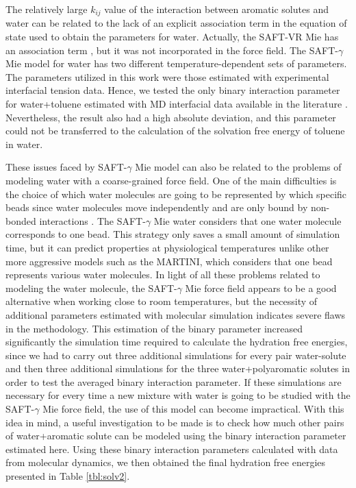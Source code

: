 \documentclass[final,12p,times,twocolumn]{elsarticle}
\begin{document}
	The relatively large $k_{ij}$ value of the interaction between aromatic solutes and water can be related to the lack of an explicit association term in the equation of state used to obtain the parameters for water. Actually, the SAFT-VR Mie has an association term \cite{lafitte2013}, but it was not incorporated in the force field. The SAFT-$\gamma$ Mie model for water \cite{lobanova2016} has two different temperature-dependent sets of parameters. The parameters utilized in this work were those estimated with experimental interfacial tension data. Hence, we tested the only binary interaction parameter for water+toluene estimated with MD interfacial data available in the literature \cite{herdes2017}. Nevertheless, the result also had a high absolute deviation, and this parameter could not be transferred to the calculation of the solvation free energy of toluene in water. 
	
	These issues faced by SAFT-$\gamma$ Mie model can also be related to the problems of modeling water with a coarse-grained force field. One of the main difficulties is the choice of which water molecules are going to be represented by which specific beads since water molecules move independently and are only bound by non-bonded interactions \cite{hadley2010,hadley2012}. The  SAFT-$\gamma$ Mie water considers that one water molecule corresponds to one bead. This strategy only saves a small amount of simulation time, but it can predict properties at physiological temperatures unlike other more aggressive models such as the MARTINI, which considers that one bead represents various water molecules. In light of all these problems related to modeling the water molecule, the SAFT-$\gamma$ Mie force field appears to be a good alternative when working close to room temperatures, but the necessity of additional parameters estimated with molecular simulation indicates severe flaws in the methodology. This estimation of the binary parameter increased significantly the simulation time required to calculate the hydration free energies, since we had to carry out three additional simulations for every pair water-solute and then three additional simulations for the three water+polyaromatic solutes in order to test the averaged binary interaction parameter. If these simulations are necessary for every time a new mixture with water is going to be studied with the SAFT-$\gamma$ Mie force field, the use of this model can become impractical.  With this idea in mind, a useful investigation to be made is to check how much other pairs of water+aromatic solute can be modeled using the binary interaction parameter estimated here. Using these binary interaction parameters calculated with data from molecular dynamics, we then obtained the final hydration free energies presented in Table \ref{tbl:solv2}. 
	
\end{document}
